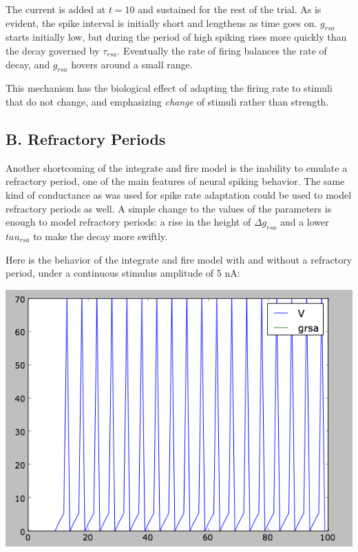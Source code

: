 \documentclass[12pt]{article}
\begin{document}
The current is added at $t=10$ and sustained for the rest of the trial.  As is evident, the spike interval is initially short and lengthens as time goes on.  $g_{rsa}$ starts initially low, but during the period of high spiking rises more quickly than the decay governed by $\tau_{rsa}$.  Eventually the rate of firing balances the rate of decay, and $g_{rsa}$ hovers around a small range.  

This mechanism has the biological effect of adapting the firing rate to stimuli that do not change, and emphasizing {\em change} of stimuli rather than strength.  

\subsection{B. Refractory Periods}

Another shortcoming of the integrate and fire model is the inability to emulate a refractory period, one of the main features of neural spiking behavior.  The same kind of conductance as was used for spike rate adaptation could be used to model refractory periods as well.  A simple change to the values of the parameters is enough to model refractory periods: a rise in the height of $\Delta g_{rsa}$ and a lower $tau_{rsa}$ to make the decay more swiftly.  

Here is the behavior of the integrate and fire model with and without a refractory period, under a continuous stimulus amplitude of 5 nA:

\vspace{15pt}
\includegraphics[scale=0.5]{vanillaif.png}
\vspace{5pt}
\end{document}
